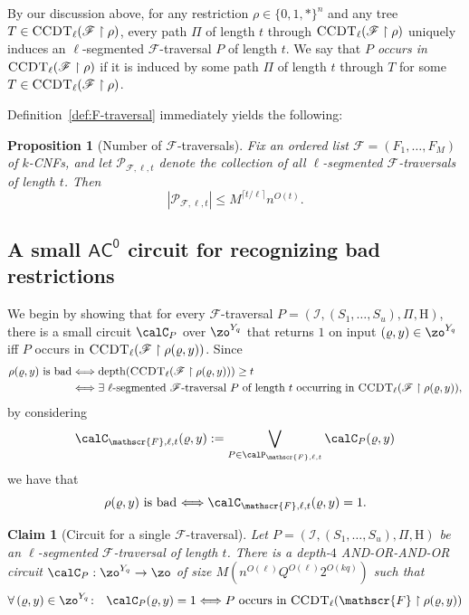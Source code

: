 \documentclass[11pt]{article}
\numberwithin{equation}{section}
\newtheorem{proposition}[theorem]{Proposition}
\newtheorem{claim}[theorem]{Claim}
\theoremstyle{definition}
\theoremstyle{plain}
\theoremstyle{plain}
\newcommand{\acz}{\mathsf{AC^0}}
\newcommand{\uhr}{\upharpoonright}
\newcommand{\CCDT}{\textsc{CCDT}}
\newcommand{\depth}{\mathrm{depth}}
\begin{document}
By our discussion above, for any restriction $\rho \in \{0,1,\ast\}^n$ and any tree $T \in \CCDT_\ell(\mathscr{F} \uhr \rho)$, every path $\Pi$ of length $t$ through $\CCDT_{\ell}(\mathscr{F}\uhr \rho)$ uniquely induces an $\ell$-segmented $\mathscr{F}$-traversal $P$ of length $t$.  We say that \emph{$P$ occurs in $\CCDT_{\ell}(\mathscr{F}\uhr\rho)$} if it is induced by some path $\Pi$ of length $t$ through $T$ for some $T \in \CCDT_\ell(\mathscr{F} \uhr \rho)$.

Definition~\ref{def:F-traversal} immediately yields the following: 

\begin{proposition}[Number of $\mathscr{F}$-traversals]
\label{prop:number-of-traversals} 
Fix an ordered list $\mathscr{F} = (F_1,\ldots,F_M)$ of $k$-CNFs, and let $\mathcal{P}_{\mathscr{F},\ell,t}$ denote the collection of all $\ell$-segmented $\mathscr{F}$-traversals of length $t$. Then 
\[ |\mathcal{P}_{\mathscr{F},\ell,t}| \le  M^{\lceil t/\ell \rceil} n^{O(t)}. \] 
\end{proposition} 




\subsection{A small $\acz$ circuit for recognizing bad restrictions} \label{sec:small-acz-bad}

We begin by showing that for every $\mathscr{F}$-traversal $P = (\mathscr{I}, (S_1,\ldots,S_u), \Pi,{\mathrm{H}})$, there is a small circuit $\calC_P$ over $\zo^{Y_q}$ that returns $1$ on input $(\varrho,y)\in \zo^{Y_q}$ iff $P$ occurs in $\CCDT_\ell(\mathscr{F}\uhr \rho(\varrho,y))$.  Since
\begin{align*}
\text{$\rho(\varrho,y)$ is bad} &\Longleftrightarrow \depth(\CCDT_\ell(\mathscr{F} \uhr \rho(\varrho,y))) \ge t \\
&\Longleftrightarrow \text{$\exists$ $\ell$-segmented $\mathscr{F}$-traversal $P$ of length $t$ occurring in $\CCDT_\ell(\mathscr{F}\uhr\rho(\varrho,y))$},
\end{align*}
by considering  
\begin{equation}
   \calC_{\mathscr{F},\ell,t}(\varrho,y) := \bigvee_{P\in\calP_{\mathscr{F},\ell,t}} \calC_P(\varrho,y) \label{eq:big-or} 
   \end{equation} 
we have that 
\[ \text{$\rho(\varrho,y)$ is bad $\Longleftrightarrow \calC_{\mathscr{F},\ell,t}(\varrho,y) = 1$.}
 \] 
\begin{claim}[Circuit for a single $\mathscr{F}$-traversal]
\label{claim:subcircuit} 
Let $P = (\mathscr{I}, (S_1,\ldots,S_{u}), \Pi, {\mathrm{H}})$ be an $\ell$-segmented $\mathscr{F}$-traversal of length $t$. There is a depth-$4$ AND-OR-AND-OR circuit $\calC_P : \zo^{Y_q} \to \zo$ of size $M(n^{O(\ell)} Q^{O(\ell)}2^{O(kq)})$ such that
\[ \forall\,(\varrho,y)\in \zo^{Y_q}\colon\ \ \calC_P(\varrho,y) =1 \Longleftrightarrow \text{$P$ occurs in $\CCDT_\ell(\mathscr{F}\uhr\rho(\varrho,y))$} \] 
\end{claim} 
\end{document}
